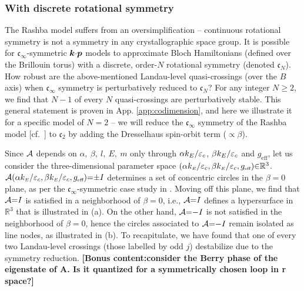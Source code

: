 \documentclass[aps, prb, showpacs, twocolumn, notitlepage, superscriptaddress]{revtex4-1}
\begin{document}
\subsubsection{With discrete rotational symmetry}\label{sec:disrot}


The Rashba model suffers from an oversimplification -- continuous rotational symmetry is not a symmetry in any crystallographic space group. It is possible for $\mathfrak{c}_{\infty}$-symmetric $\boldsymbol{k}{\cdot}\boldsymbol{p}$ models to approximate Bloch Hamiltonians (defined over the Brillouin torus) with a discrete, order-$N$ rotational symmetry (denoted $\mathfrak{c}_N$). How robust are the above-mentioned Landau-level quasi-crossings  (over the $B$ axis) when $\mathfrak{c}_{\infty}$ symmetry is perturbatively reduced to $\mathfrak{c}_N$? For any  integer $N{\geq}2$, we find that $N{-}1$ of every $N$ quasi-crossings  are perturbatively stable. This general statement is proven in App. \ref{app:codimension}, and here we illustrate it for a specific model of $N{=}2$ -- we will reduce the $\mathfrak{c}_{\infty}$ symmetry of the Rashba model [cf.\ ] to  $\mathfrak{c}_2$  by adding the Dresselhaus spin-orbit term (${\propto} \beta$).  

Since ${\cal A}$ depends on $\alpha,~\beta,~l,~E,~m$ only through $\alpha k_E /\varepsilon_c$, $\beta k_E /\varepsilon_c$ and $g_\text{eff}$, let us consider the three-dimensional parameter space $(\alpha k_{\scriptscriptstyle{E}}/\varepsilon_c,\beta k_{\scriptscriptstyle{E}}/\varepsilon_c,g_{\scriptscriptstyle{\text{eff}}}){\in} \mathbb{R}^3$.  ${\cal A}(\alpha k_{\scriptscriptstyle{E}}/\varepsilon_c,\beta k_{\scriptscriptstyle{E}}/\varepsilon_c,g_{\scriptscriptstyle{\text{eff}}}){=}{\pm} I$ determines a set of concentric circles in the $\beta{=}0$ plane, as per the $\mathfrak{c}_{\infty}$-symmetric case study in . Moving off this plane, we find that ${\cal A}{=}I$ is satisfied in a  neighborhood of $\beta{=}0$, i.e., ${\cal A}{=}I$ defines a hypersurface in $\mathbb{R}^3$ that is illustrated in (a). On the other hand, ${\cal A}{=}{-}I$ is not satisfied in the neighborhood of $\beta{=}0$, hence the circles associated to ${\cal A}{=}{-}I$ remain isolated as line nodes, as illustrated in (b). To recapitulate, we have found that one of every two Landau-level crossings (those labelled by odd $j$) destabilize due to the symmetry reduction. \textbf{[Bonus content:consider the Berry phase of the eigenstate of A. Is it quantized for a symmetrically chosen loop in r space?]}
\end{document}
